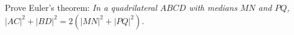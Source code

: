 Prove Euler's theorem: \emph{In a quadrilateral $ABCD$ with medians $MN$ and $PQ$, $|AC|^2 + |BD|^2 = 2\left(|MN|^2 + |PQ|^2\right)$.}
